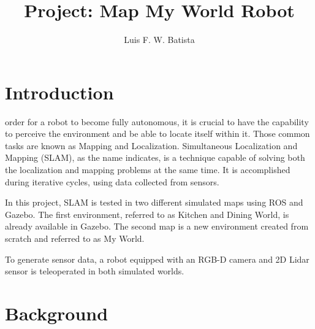 \documentclass[10pt,journal,compsoc]{IEEEtran}
\begin{document}
\title{Project: Map My World Robot}

\author{Luis F. W. Batista}

%
{}


\maketitle
\IEEEdisplaynontitleabstractindextext
\IEEEpeerreviewmaketitle
\section{Introduction}

 order for a robot to become fully autonomous, it is crucial to have the capability to perceive the environment and be able to locate itself within it. Those common tasks are known as Mapping and Localization. Simultaneous Localization and Mapping (SLAM), as the name indicates, is a technique capable of solving both the localization and mapping problems at the same time. It is accomplished during iterative cycles, using data collected from sensors.

In this project, SLAM is tested in two different simulated maps using ROS and Gazebo. The first environment, referred to as Kitchen and Dining World, is already available in Gazebo. The second map is a new environment created from scratch and referred to as My World.

To generate sensor data, a robot equipped with an RGB-D camera and 2D Lidar sensor is teleoperated in both simulated worlds.


\section{Background}
\end{document}
